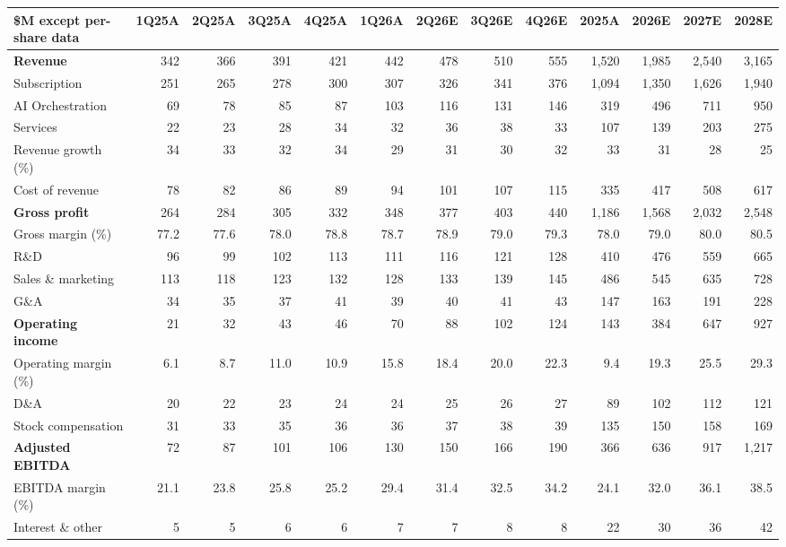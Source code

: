\documentclass[theme=institutional-research,publication-type=equity-research]{reportkit}
\begin{document}
\begin{fullwidthexhibit}
\begin{exhibit}[
  title={Income statement and key operating metrics},
  source={Company data; ReportKit Research estimates.},
  label={tab:financial-model}
]
\begin{financialmodelpage}
\begin{tabular}{@{}lrrrrrrrrrrrr@{}}
\toprule
\textbf{\$M except per-share data} & \textbf{1Q25A}&\textbf{2Q25A}&\textbf{3Q25A}&\textbf{4Q25A}&\textbf{1Q26A}&\textbf{2Q26E}&\textbf{3Q26E}&\textbf{4Q26E}&\textbf{2025A}&\textbf{2026E}&\textbf{2027E}&\textbf{2028E}\\
\midrule
\textbf{Revenue} & 342&366&391&421&442&478&510&555&1,520&1,985&2,540&3,165\\
Subscription & 251&265&278&300&307&326&341&376&1,094&1,350&1,626&1,940\\
AI Orchestration & 69&78&85&87&103&116&131&146&319&496&711&950\\
Services & 22&23&28&34&32&36&38&33&107&139&203&275\\
Revenue growth (\%) & 34&33&32&34&29&31&30&32&33&31&28&25\\
\midrule
Cost of revenue & 78&82&86&89&94&101&107&115&335&417&508&617\\
\textbf{Gross profit} & 264&284&305&332&348&377&403&440&1,186&1,568&2,032&2,548\\
Gross margin (\%) & 77.2&77.6&78.0&78.8&78.7&78.9&79.0&79.3&78.0&79.0&80.0&80.5\\
\midrule
R\&D & 96&99&102&113&111&116&121&128&410&476&559&665\\
Sales \& marketing & 113&118&123&132&128&133&139&145&486&545&635&728\\
G\&A & 34&35&37&41&39&40&41&43&147&163&191&228\\
\textbf{Operating income} & 21&32&43&46&70&88&102&124&143&384&647&927\\
Operating margin (\%) & 6.1&8.7&11.0&10.9&15.8&18.4&20.0&22.3&9.4&19.3&25.5&29.3\\
\midrule
D\&A & 20&22&23&24&24&25&26&27&89&102&112&121\\
Stock compensation & 31&33&35&36&36&37&38&39&135&150&158&169\\
\textbf{Adjusted EBITDA} & 72&87&101&106&130&150&166&190&366&636&917&1,217\\
EBITDA margin (\%) & 21.1&23.8&25.8&25.2&29.4&31.4&32.5&34.2&24.1&32.0&36.1&38.5\\
\midrule
Interest \& other & 5&5&6&6&7&7&8&8&22&30&36&42\\

\end{tabular}
\end{financialmodelpage}
\end{exhibit}
\end{fullwidthexhibit}
\end{document}
